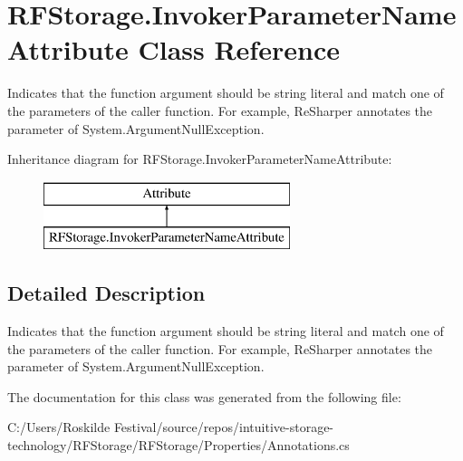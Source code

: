 \section{R\+F\+Storage.\+Invoker\+Parameter\+Name\+Attribute Class Reference}
\label{class_r_f_storage_1_1_invoker_parameter_name_attribute}


Indicates that the function argument should be string literal and match one of the parameters of the caller function. For example, Re\+Sharper annotates the parameter of System.\+Argument\+Null\+Exception.  


Inheritance diagram for R\+F\+Storage.\+Invoker\+Parameter\+Name\+Attribute\+:\begin{figure}[H]
\begin{center}
\leavevmode
\includegraphics[height=2.000000cm]{class_r_f_storage_1_1_invoker_parameter_name_attribute}
\end{center}
\end{figure}


\subsection{Detailed Description}
Indicates that the function argument should be string literal and match one of the parameters of the caller function. For example, Re\+Sharper annotates the parameter of System.\+Argument\+Null\+Exception. 


\begin{DoxyCode}{0}
\DoxyCodeLine{\}}
\end{DoxyCode}


The documentation for this class was generated from the following file\+:\begin{DoxyCompactItemize}
\item 
C\+:/\+Users/\+Roskilde Festival/source/repos/intuitive-\/storage-\/technology/\+R\+F\+Storage/\+R\+F\+Storage/\+Properties/Annotations.\+cs\end{DoxyCompactItemize}
